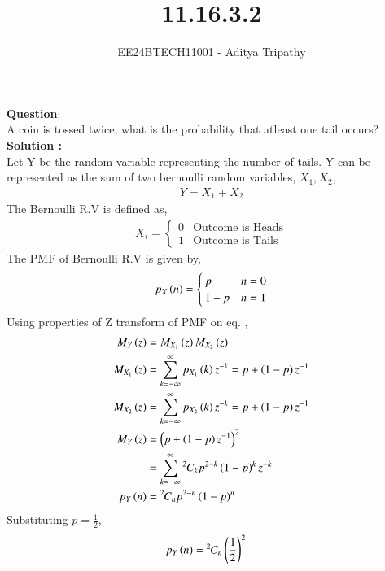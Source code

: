 \documentclass[journal]{IEEEtran}
\begin{document}

\vspace{3cm}

\title{11.16.3.2}
\author{EE24BTECH11001 - Aditya Tripathy}
 \maketitle
{\let\newpage\relax\maketitle}

\renewcommand{\thefigure}{\theenumi}
\renewcommand{\thetable}{\theenumi}
\setlength{\intextsep}{10pt} %


\renewcommand{\thetable}{\theenumi}


\textbf{Question}:\\
A coin is tossed twice, what is the probability that atleast one tail occurs?
\\
\textbf{Solution :}\\
Let Y be the random variable representing the number of tails. Y can be represented as the sum of two bernoulli random variables, $X_1, X_2$,
\begin{align}
  Y = X_1 + X_2
\end{align}
The Bernoulli R.V is defined as,
\begin{align}
	X_i = \begin{cases}
		0 & \text{Outcome is Heads}\\	
		1 & \text{Outcome is Tails}	
	\end{cases}
\end{align}
The PMF of Bernoulli R.V is given by,
\begin{align}
  p_X\left(n\right) = \begin{cases}
    p & n = 0\\
    1-p & n = 1
  \end{cases}
\end{align}
Using properties of Z transform of PMF on eq. ,
\begin{align}
  M_Y\left(z\right) &= M_{X_1}\left(z\right)M_{X_2}\left(z\right)\\
  M_{X_1}\left(z\right) &= \sum_{k = -\infty}^{\infty} p_{X_1}\left(k\right)z^{-k} = p + \left(1-p\right)z^{-1}\\
  M_{X_2}\left(z\right) &= \sum_{k = -\infty}^{\infty} p_{X_2}\left(k\right)z^{-k} = p + \left(1-p\right)z^{-1}\\
  M_Y\left(z\right) &= \left(p + \left(1-p\right)z^{-1}\right)^2\\
              &= \sum_{k = -\infty}^{\infty} {{}^{2}\mkern-1muC_{k}}p^{2-k}\left(1-p\right)^{k}z^{-k}\\
  p_Y\left(n\right) &= {{}^{2}\mkern-1muC_{n}} p^{2-n}\left(1-p\right)^n
\end{align}
Substituting $p = \frac{1}{2}$,
\begin{align}
  p_Y\left(n\right) &= {{}^{2}\mkern-1muC_{n}}\left(\frac{1}{2}\right)^2
\end{align}
\end{document}
